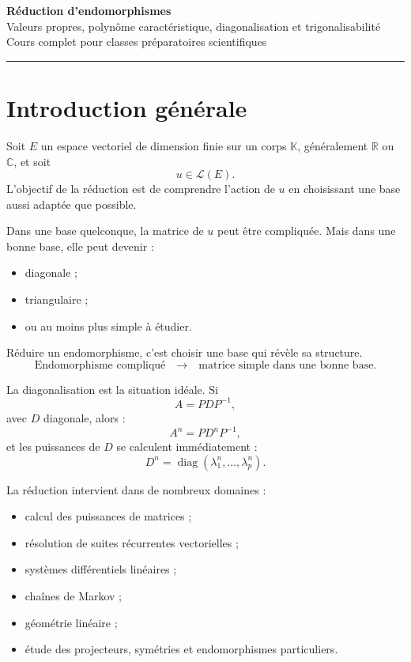 \documentclass[11pt,a4paper]{article}
\newcommand{\K}{\mathbb K}
\newcommand{\R}{\mathbb R}
\newcommand{\C}{\mathbb C}
\newcommand{\Lcal}{\mathcal L}
\newcommand{\diag}{\operatorname{diag}}
\begin{document}
\begin{center}
    {\Huge \textbf{Réduction d'endomorphismes}}\\[2mm]
    {\Large Valeurs propres, polynôme caractéristique, diagonalisation et trigonalisabilité}\\[2mm]
    {\large Cours complet pour classes préparatoires scientifiques}\\[2mm]
    \rule{0.88\linewidth}{0.5pt}
\end{center}

\vspace{0.4cm}

\tableofcontents

\newpage

\section*{Introduction générale}

Soit \(E\) un espace vectoriel de dimension finie sur un corps \(\K\), généralement \(\R\) ou \(\C\), et soit
\[
u\in\Lcal(E).
\]
L'objectif de la réduction est de comprendre l'action de \(u\) en choisissant une base aussi adaptée que possible.

Dans une base quelconque, la matrice de \(u\) peut être compliquée.  
Mais dans une bonne base, elle peut devenir :
\begin{itemize}
    \item diagonale ;
    \item triangulaire ;
    \item ou au moins plus simple à étudier.
\end{itemize}

\begin{retenirbox}
Réduire un endomorphisme, c'est choisir une base qui révèle sa structure.
\[
\text{Endomorphisme compliqué}
\quad\longrightarrow\quad
\text{matrice simple dans une bonne base.}
\]
\end{retenirbox}

La diagonalisation est la situation idéale. Si
\[
A=PDP^{-1},
\]
avec \(D\) diagonale, alors :
\[
A^n=PD^nP^{-1},
\]
et les puissances de \(D\) se calculent immédiatement :
\[
D^n=\diag(\lambda_1^n,\dots,\lambda_p^n).
\]

La réduction intervient dans de nombreux domaines :
\begin{itemize}
    \item calcul des puissances de matrices ;
    \item résolution de suites récurrentes vectorielles ;
    \item systèmes différentiels linéaires ;
    \item chaînes de Markov ;
    \item géométrie linéaire ;
    \item étude des projecteurs, symétries et endomorphismes particuliers.
\end{itemize}
\end{document}
